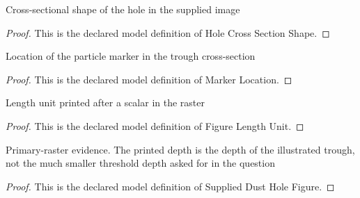 \begin{definition}
  \label{def:physics:phyx-mini-0654:phyxminiproblems-problemphyxmini0654-holecrosssectionshape}
  Cross-sectional shape of the hole in the supplied image
\end{definition}
\begin{proof}
  This is the declared model definition of Hole Cross Section Shape.
\end{proof}
\begin{definition}
  \label{def:physics:phyx-mini-0654:phyxminiproblems-problemphyxmini0654-markerlocation}
  Location of the particle marker in the trough cross-section
\end{definition}
\begin{proof}
  This is the declared model definition of Marker Location.
\end{proof}
\begin{definition}
  \label{def:physics:phyx-mini-0654:phyxminiproblems-problemphyxmini0654-figurelengthunit}
  Length unit printed after a scalar in the raster
\end{definition}
\begin{proof}
  This is the declared model definition of Figure Length Unit.
\end{proof}
\begin{definition}
  \label{def:physics:phyx-mini-0654:phyxminiproblems-problemphyxmini0654-supplieddustholefigure}
  Primary-raster evidence. The printed depth is the depth of the illustrated trough, not the much smaller threshold depth asked for in the question
\end{definition}
\begin{proof}
  This is the declared model definition of Supplied Dust Hole Figure.
\end{proof}
